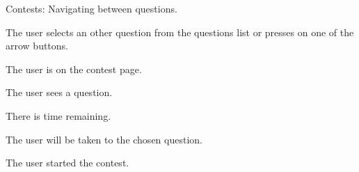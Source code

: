 \documentclass[10pt,a4paper]{article}
\begin{document}
\begin{uc}{Contests: Navigating between questions.}


    \begin{uc-mss}
    \item The user selects an other question from the questions list or presses on one of the arrow buttons. 
    \end{uc-mss}

    \begin{uc-pre}
    \item The user is on the contest page.
    \item The user sees a question. 
    \item There is time remaining. 
    \end{uc-pre}

    \begin{uc-post}
    \item The user will be taken to the chosen question.
    \end{uc-post}

    \begin{uc-trig}
    The user started the contest. 
    \end{uc-trig}

\end{uc}
\end{document}
